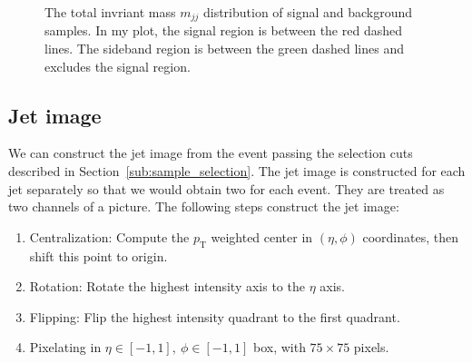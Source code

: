 \documentclass[12pt]{article}
\begin{document}
        \begin{figure}[htpb]
            \centering

            \caption{The total invriant mass $m_{jj}$ distribution of signal and background samples. In my plot, the signal region is between the red dashed lines. The sideband region is between the green dashed lines and excludes the signal region.}
            \label{fig:HVmodel_mjj_distribution}
        \end{figure}
    \subsection{Jet image}%
    \label{sub:jet_image}
        We can construct the jet image from the event passing the selection cuts described in Section~\ref{sub:sample_selection}. The jet image is constructed for each jet separately so that we would obtain two for each event. They are treated as two channels of a picture. The following steps construct the jet image:
        \begin{enumerate}
            \item Centralization: Compute the $p_{\text{T}}$ weighted center in $\left( \eta,\phi \right) $ coordinates, then shift this point to origin.
            \item Rotation: Rotate the highest intensity axis to the $\eta$ axis.
            \item Flipping: Flip the highest intensity quadrant to the first quadrant.
            \item Pixelating in $\eta \in [-1,1],\ \phi \in [-1,1]$ box, with $75\times 75$ pixels.
        \end{enumerate}
\end{document}
